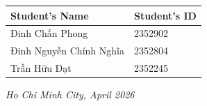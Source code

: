 \begin{titlepage}
    \begin{center}
        \begin{tabular}{ll}
            \hline
            \textbf{Student's Name} & \textbf{Student's ID} \\
            \hline
            Đinh Chấn Phong         & 2352902               \\
            Đinh Nguyễn Chính Nghĩa & 2352804               \\
            Trần Hữu Đạt            & 2352245               \\
            \hline
        \end{tabular}
    \end{center}

    \vspace{1cm}

    \begin{center}
        {\em Ho Chi Minh City, April 2026}
    \end{center}
\end{titlepage}
